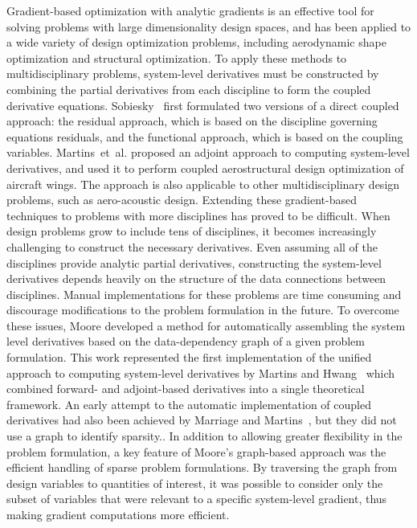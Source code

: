 \documentclass[]{aiaa-tc} %
\begin{document}
    Gradient-based optimization with analytic gradients is an effective tool for solving problems
    with large dimensionality design spaces, and has been applied to a wide variety of design optimization problems, including aerodynamic shape optimization \cite{Liou2010,palacios2012adjoint,Lyu2014b}
    and structural optimization\cite{Kennedy:2013:TACS, Venkataraman:2004:SOC, Adelman:1986:structure-sensitivity}.
    To apply these methods to multidisciplinary problems, system-level derivatives must be
    constructed by combining the partial derivatives from each discipline to form the coupled derivative equations. Sobiesky~\cite{Sobieski1990} first formulated two versions of a direct coupled approach: the residual approach, which is based on the discipline governing equations residuals, and the functional approach, which is based on the coupling variables. Martins~et~al.\cite{Martins:2005:CAS,martins2013} proposed an adjoint approach to computing system-level derivatives, and used it
    to perform coupled
    aerostructural design optimization of aircraft wings\cite{Kenway2014a,Kenway2014c}. The approach is also applicable to
    other multidisciplinary design problems, such as aero-acoustic design\cite{economon2012coupled}. Extending these
    gradient-based techniques to problems with more disciplines has proved to be difficult. When
    design problems grow to include tens of disciplines, it becomes increasingly challenging to construct the
    necessary derivatives. Even assuming all of the disciplines provide analytic partial derivatives,
    constructing the system-level derivatives depends heavily on the structure of the data connections
    between disciplines. Manual implementations for these problems are time consuming and discourage modifications
    to the problem formulation in the future. To overcome these issues, Moore\cite{openmdao_derivatives} developed a method for automatically assembling the system
    level derivatives based on the data-dependency graph of a given problem formulation. This
    work represented the first implementation of the unified approach to computing system-level derivatives by Martins and Hwang~\cite{martins2013}
    which combined forward- and adjoint-based derivatives into a single theoretical framework. An early attempt to the automatic implementation of coupled derivatives had also been achieved by Marriage and Martins~\cite{Marriage:2008a}, but they did not use a graph to identify sparsity..
    In addition to allowing greater flexibility in the problem formulation, a key feature of Moore's graph-based approach was the efficient
    handling of sparse problem formulations. By traversing the graph from design variables to quantities of interest,
    it was possible to consider only the subset of variables that were relevant to a specific system-level gradient, thus
    making gradient computations more efficient.
\end{document}
